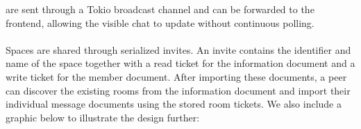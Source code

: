 \documentclass{article} %
\begin{document}
are sent through a Tokio broadcast channel and can be forwarded to the
frontend, allowing the visible chat to update without continuous polling.
\\
\\
Spaces are shared through serialized invites. An invite contains the identifier
and name of the space together with a read ticket for the information document
and a write ticket for the member document. After importing these documents, a
peer can discover the existing rooms from the information document and import
their individual message documents using the stored room tickets.
We also include a graphic below to illustrate the design further:
\end{document}
